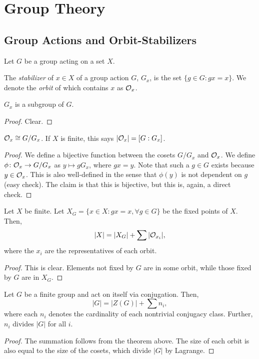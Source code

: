 \section{Group Theory}

\subsection{Group Actions and Orbit-Stabilizers}

Let $G$ be a group acting on a set $X$.

\begin{df}
The \emph{stabilizer} of $x \in X$ of a group action $G$, $G_x$, is the 
set $\{g \in G \colon gx = x\}$. We denote the \emph{orbit} of which 
contains $x$ as $\mathcal{O}_x$.
\end{df}

\begin{proposition}
$G_x$ is a subgroup of $G$.
\end{proposition}
\begin{proof}
    Clear.
\end{proof}

\begin{proposition}
    $\mathcal{O}_x \cong G/G_x$. If $X$ is finite, this says $|\mathcal{O}_x| = [G:G_x]$.
\end{proposition}
\begin{proof}
    We define a bijective function between the cosets $G/G_x$ and $\mathcal{O}_x$. We define
    $\phi \colon \mathcal{O}_x \rightarrow G/G_x$ as $y \mapsto gG_x$, where $gx = y$. Note that 
    such a $g \in G$ exists because $y \in \mathcal{O}_x$. This is also well-defined in the sense 
    that $\phi(y)$ is not dependent on $g$ (easy check). The claim is that this is bijective,
    but this is, again, a direct check.
\end{proof}

\begin{proposition}
    Let $X$ be finite.
    Let $X_G = \{x \in X \colon gx = x, \forall g \in G\}$ be the fixed points of $X$. Then,
    \[
    |X| = |X_G| + \sum |\mathcal{O}_{x_i}|,
    \]
    where the $x_i$ are the representatives of each orbit.
\end{proposition}
\begin{proof}
    This is clear. Elements not fixed by $G$ are in some orbit, while those fixed by $G$ are 
    in $X_G$.
\end{proof}

\begin{corollary}
    Let $G$ be a finite group and act on itself via conjugation. Then,
    \[
    |G| = |Z(G)| + \sum n_i,
    \]
    where each $n_i$ denotes the cardinality of each nontrivial conjugacy class.
    Further, $n_i$ divides $|G|$ for all $i$.
\end{corollary}
\begin{proof}
    The summation follows from the theorem above. The size of each orbit is also equal to 
    the size of the cosets, which divide $|G|$ by Lagrange.
\end{proof}

